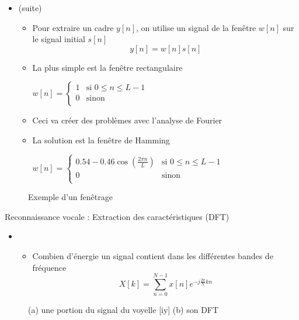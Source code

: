 \documentclass{KodeBook}
\begin{document}
\begin{itemize}
	\item {} (suite)
	\begin{itemize}
		\item Pour extraire un cadre $y[n]$, on utilise un signal de la fenêtre $w[n]$ sur le signal initial $s[n]$
		\[y[n] = w[n] s[n]\]
		\item La plus simple est la fenêtre rectangulaire 
		
		$w[n] = \begin{cases}
		1 & \text{si } 0 \le n \le L-1 \\
		0 & \text{sinon }\\
		\end{cases}$
		\item Ceci va créer des problèmes avec l'analyse de Fourier 
		\item La solution est la fenêtre de Hamming
		
		$w[n] = \begin{cases}
		0.54 - 0.46 \cos (\frac{2\pi n}{L}) & \text{si } 0 \le n \le L-1 \\
		0 & \text{sinon }\\
		\end{cases}$
	\end{itemize}
\end{itemize}

\begin{figure}
	\centering
	\caption{Exemple d'un fenêtrage \cite{2020-jurafsky-martin}}
\end{figure}

Reconnaissance vocale : Extraction des caractéristiques (DFT)

\begin{itemize}
	\item {}
	\begin{itemize}
		\item Combien d'énergie un signal contient dans les différentes bandes de fréquence
		\[X[k] = \sum\limits_{n=0}^{N-1} x[n] e^{-j\frac{2\pi}{N} k n}\]
	\end{itemize}
\end{itemize}
\begin{figure}
	\centering
	\caption{(a) une portion du signal du voyelle [iy] (b) son DFT \cite{2020-jurafsky-martin}}
\end{figure}
\end{document}
